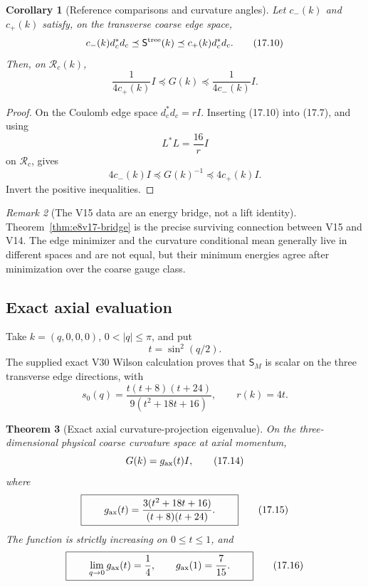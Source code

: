 \documentclass[11pt,oneside]{book}
\newtheorem{theorem}{Theorem}[chapter]
\newtheorem{corollary}[theorem]{Corollary}
\theoremstyle{definition}
\theoremstyle{remark}
\newtheorem{remark}[theorem]{Remark}
\begin{document}
\begin{corollary}[Reference comparisons and curvature angles]
\label{cor:e8v17-comparison}
Let \(c_-(k)\) and \(c_+(k)\) satisfy, on the transverse coarse edge
space,
\[
 c_-(k)d_c^*d_c
 \preceq\mathsf S^{\rm tree}(k)
 \preceq c_+(k)d_c^*d_c.                           \tag{17.10}
\]
Then, on \(\mathcal R_c(k)\),
\[
\boxed{\qquad
 \frac1{4c_+(k)}I\preceq G(k)
 \preceq\frac1{4c_-(k)}I.
\qquad}                                            \tag{17.11}
\]
\end{corollary}

\begin{proof}
On the Coulomb edge space \(d_c^*d_c=rI\).  Inserting (17.10) into
(17.7), and using
\[
 L^*L=\frac{16}{r}I
\]
on \(\mathcal R_c\), gives
\[
 4c_-(k)I\preceq G(k)^{-1}\preceq4c_+(k)I.
\]
Invert the positive inequalities.
\end{proof}

\begin{remark}[The V15 data are an energy bridge, not a lift identity]
\label{rem:e8v17-v15}
Theorem~\ref{thm:e8v17-bridge} is the precise surviving connection
between V15 and V14.  The edge minimizer and the curvature conditional
mean generally live in different spaces and are not equal, but their
minimum energies agree after minimization over the coarse gauge
class.
\end{remark}

\subsection{Exact axial evaluation}

Take \(k=(q,0,0,0)\), \(0<|q|\leq\pi\), and put
\[
                         t=\sin^2(q/2).             \tag{17.12}
\]
The supplied exact V30 Wilson calculation proves that
\(\mathsf S_M\) is scalar on the three transverse edge directions,
with
\[
 s_0(q)=\frac{t(t+8)(t+24)}
                  {9(t^2+18t+16)},\qquad r(k)=4t.  \tag{17.13}
\]

\begin{theorem}[Exact axial curvature-projection eigenvalue]
\label{thm:e8v17-axial}
On the three-dimensional physical coarse curvature space at axial
momentum,
\[
                         G(k)=g_{\rm ax}(t)I,        \tag{17.14}
\]
where
\[
\boxed{\qquad
 g_{\rm ax}(t)
 =\frac{3(t^2+18t+16)}{(t+8)(t+24)}.
\qquad}                                             \tag{17.15}
\]
The function is strictly increasing on \(0\leq t\leq1\), and
\[
\boxed{\qquad
 \lim_{q\to0}g_{\rm ax}(t)=\frac14,\qquad
 g_{\rm ax}(1)=\frac7{15}.
\qquad}                                             \tag{17.16}
\]
\end{theorem}
\end{document}
